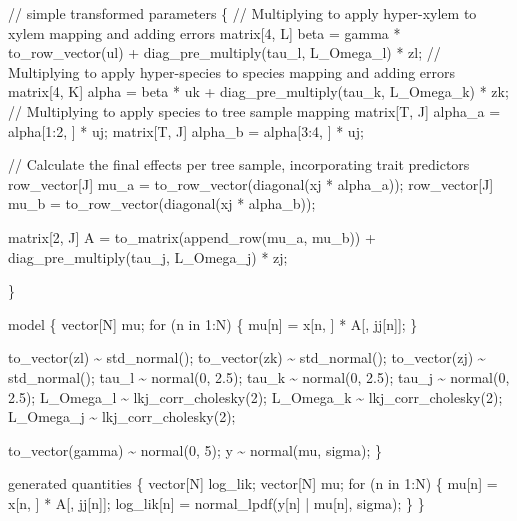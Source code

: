 \documentclass[
  12pt,
  letterpaper,
  DIV=11,
  numbers=noendperiod]{scrartcl}
\newenvironment{Shaded}{\begin{snugshade}}{\end{snugshade}}
\newcommand{\CommentTok}[1]{\textcolor[rgb]{0.37,0.37,0.37}{#1}}
\newcommand{\ControlFlowTok}[1]{\textcolor[rgb]{0.00,0.23,0.31}{#1}}
\newcommand{\DataTypeTok}[1]{\textcolor[rgb]{0.68,0.00,0.00}{#1}}
\newcommand{\DecValTok}[1]{\textcolor[rgb]{0.68,0.00,0.00}{#1}}
\newcommand{\FloatTok}[1]{\textcolor[rgb]{0.68,0.00,0.00}{#1}}
\newcommand{\KeywordTok}[1]{\textcolor[rgb]{0.00,0.23,0.31}{#1}}
\newcommand{\NormalTok}[1]{\textcolor[rgb]{0.00,0.23,0.31}{#1}}
\begin{document}
\begin{Shaded}
\begin{Highlighting}[]
\CommentTok{// simple}
\KeywordTok{transformed parameters}\NormalTok{ \{}
  \CommentTok{// Multiplying to apply hyper{-}xylem to xylem mapping and adding errors}
  \DataTypeTok{matrix}\NormalTok{[}\DecValTok{4}\NormalTok{, L] beta = gamma * to\_row\_vector(ul) + diag\_pre\_multiply(tau\_l, L\_Omega\_l) * zl;}
  \CommentTok{// Multiplying to apply hyper{-}species to species mapping and adding errors}
  \DataTypeTok{matrix}\NormalTok{[}\DecValTok{4}\NormalTok{, K] alpha = beta * uk + diag\_pre\_multiply(tau\_k, L\_Omega\_k) * zk;}
  \CommentTok{// Multiplying to apply species to tree sample mapping}
  \DataTypeTok{matrix}\NormalTok{[T, J] alpha\_a = alpha[}\DecValTok{1}\NormalTok{:}\DecValTok{2}\NormalTok{, ] * uj;}
  \DataTypeTok{matrix}\NormalTok{[T, J] alpha\_b = alpha[}\DecValTok{3}\NormalTok{:}\DecValTok{4}\NormalTok{, ] * uj;}

  \CommentTok{// Calculate the final effects per tree sample, incorporating trait predictors}
  \DataTypeTok{row\_vector}\NormalTok{[J] mu\_a = to\_row\_vector(diagonal(xj * alpha\_a));}
  \DataTypeTok{row\_vector}\NormalTok{[J] mu\_b = to\_row\_vector(diagonal(xj * alpha\_b));}

  \DataTypeTok{matrix}\NormalTok{[}\DecValTok{2}\NormalTok{, J] A = to\_matrix(append\_row(mu\_a, mu\_b)) + diag\_pre\_multiply(tau\_j, L\_Omega\_j) * zj;}

\NormalTok{\}}

\KeywordTok{model}\NormalTok{ \{}
  \DataTypeTok{vector}\NormalTok{[N] mu;}
  \ControlFlowTok{for}\NormalTok{ (n }\ControlFlowTok{in} \DecValTok{1}\NormalTok{:N) \{}
\NormalTok{    mu[n] = x[n, ] * A[, jj[n]];}
\NormalTok{  \}}

\NormalTok{  to\_vector(zl) \textasciitilde{} std\_normal();}
\NormalTok{  to\_vector(zk) \textasciitilde{} std\_normal();}
\NormalTok{  to\_vector(zj) \textasciitilde{} std\_normal();}
\NormalTok{  tau\_l \textasciitilde{} normal(}\DecValTok{0}\NormalTok{, }\FloatTok{2.5}\NormalTok{);}
\NormalTok{  tau\_k \textasciitilde{} normal(}\DecValTok{0}\NormalTok{, }\FloatTok{2.5}\NormalTok{);}
\NormalTok{  tau\_j \textasciitilde{} normal(}\DecValTok{0}\NormalTok{, }\FloatTok{2.5}\NormalTok{);}
\NormalTok{  L\_Omega\_l \textasciitilde{} lkj\_corr\_cholesky(}\DecValTok{2}\NormalTok{);}
\NormalTok{  L\_Omega\_k \textasciitilde{} lkj\_corr\_cholesky(}\DecValTok{2}\NormalTok{);}
\NormalTok{  L\_Omega\_j \textasciitilde{} lkj\_corr\_cholesky(}\DecValTok{2}\NormalTok{);}

\NormalTok{  to\_vector(gamma) \textasciitilde{} normal(}\DecValTok{0}\NormalTok{, }\DecValTok{5}\NormalTok{);}
\NormalTok{  y \textasciitilde{} normal(mu, sigma);}
\NormalTok{\}}

\KeywordTok{generated quantities}\NormalTok{ \{}
  \DataTypeTok{vector}\NormalTok{[N] log\_lik;}
  \DataTypeTok{vector}\NormalTok{[N] mu;}
  \ControlFlowTok{for}\NormalTok{ (n }\ControlFlowTok{in} \DecValTok{1}\NormalTok{:N) \{}
\NormalTok{    mu[n] = x[n, ] * A[, jj[n]];}
\NormalTok{    log\_lik[n] = normal\_lpdf(y[n] | mu[n], sigma);}
\NormalTok{  \}}
\NormalTok{\}}
\end{Highlighting}
\end{Shaded}
\end{document}

